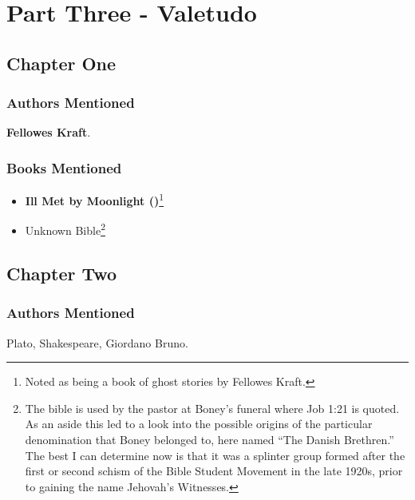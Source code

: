 \documentclass[
]{article}
\providecommand{\tightlist}{%
  \setlength{\itemsep}{0pt}\setlength{\parskip}{0pt}}
\begin{document}
\newpage

\section{Part Three - Valetudo}\label{part-three---valetudo}

\subsection{Chapter One}\label{chapter-one-2}

\subsubsection{Authors Mentioned}\label{authors-mentioned-19}

\textbf{Fellowes Kraft}.

\subsubsection{Books Mentioned}\label{books-mentioned-20}

\begin{itemize}
\tightlist
\item
  \textbf{Ill Met by Moonlight ()}\footnote{Noted as being a book of ghost stories by Fellowes
    Kraft.}
\item
  Unknown Bible\footnote{The bible is used by the pastor at Boney's
    funeral where Job 1:21 is quoted. As an aside this led to a look
    into the possible origins of the particular denomination that Boney
    belonged to, here named ``The Danish Brethren.'' The best I can
    determine now is that it was a splinter group formed after the first
    or second schism of the Bible Student Movement in the late 1920s,
    prior to gaining the name Jehovah's Witnesses.}
\end{itemize}

\subsection{Chapter Two}\label{chapter-two-1}

\subsubsection{Authors Mentioned}\label{authors-mentioned-20}

Plato, Shakespeare, Giordano Bruno.
\end{document}
